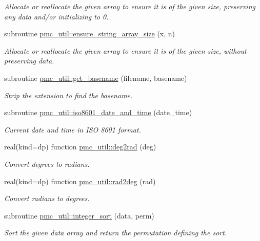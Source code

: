\begin{DoxyCompactItemize}
\begin{DoxyCompactList}\small\item\em Allocate or reallocate the given array to ensure it is of the given size, preserving any data and/or initializing to 0. \end{DoxyCompactList}\item 
subroutine \mbox{\hyperlink{namespacepmc__util_a61a37625f7eff4bd4bbba002652b596d}{pmc\+\_\+util\+::ensure\+\_\+string\+\_\+array\+\_\+size}} (x, n)
\begin{DoxyCompactList}\small\item\em Allocate or reallocate the given array to ensure it is of the given size, without preserving data. \end{DoxyCompactList}\item 
subroutine \mbox{\hyperlink{namespacepmc__util_a4a6576eb74e7fb0c14d7190b44b62c5c}{pmc\+\_\+util\+::get\+\_\+basename}} (filename, basename)
\begin{DoxyCompactList}\small\item\em Strip the extension to find the basename. \end{DoxyCompactList}\item 
subroutine \mbox{\hyperlink{namespacepmc__util_aac8c9feb22730857691a4de7b68a041f}{pmc\+\_\+util\+::iso8601\+\_\+date\+\_\+and\+\_\+time}} (date\+\_\+time)
\begin{DoxyCompactList}\small\item\em Current date and time in I\+SO 8601 format. \end{DoxyCompactList}\item 
real(kind=dp) function \mbox{\hyperlink{namespacepmc__util_a46d994b9563ad325253e528f983cb3cc}{pmc\+\_\+util\+::deg2rad}} (deg)
\begin{DoxyCompactList}\small\item\em Convert degrees to radians. \end{DoxyCompactList}\item 
real(kind=dp) function \mbox{\hyperlink{namespacepmc__util_aee025b9d181017a7c928195ae1148b27}{pmc\+\_\+util\+::rad2deg}} (rad)
\begin{DoxyCompactList}\small\item\em Convert radians to degrees. \end{DoxyCompactList}\item 
subroutine \mbox{\hyperlink{namespacepmc__util_a32c8275ed718fa49d7ebd55eca41ef70}{pmc\+\_\+util\+::integer\+\_\+sort}} (data, perm)
\begin{DoxyCompactList}\small\item\em Sort the given data array and return the permutation defining the sort. \end{DoxyCompactList}\item 

\end{DoxyCompactItemize}
